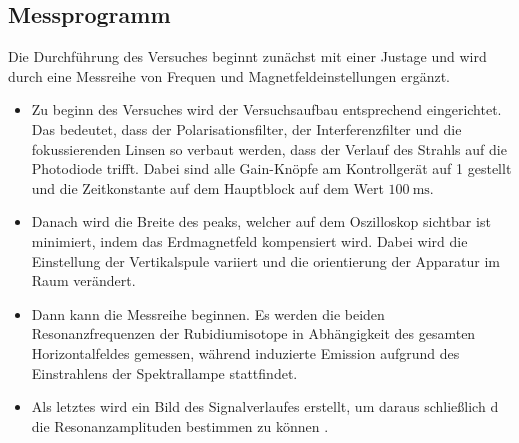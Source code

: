 \subsection{Messprogramm}

Die Durchführung des Versuches beginnt zunächst mit einer Justage und wird 
durch eine Messreihe von Frequen und Magnetfeldeinstellungen ergänzt.

\begin{itemize}
    \item Zu beginn des Versuches wird der Versuchsaufbau entsprechend eingerichtet.
    Das bedeutet, dass der Polarisationsfilter, der Interferenzfilter und die 
    fokussierenden Linsen so verbaut werden, dass der Verlauf des Strahls auf die 
    Photodiode trifft.
    Dabei sind alle Gain-Knöpfe am Kontrollgerät auf 1 gestellt und die Zeitkonstante auf 
    dem Hauptblock auf dem Wert $\SI{100}{\milli\second}$.
    \item Danach wird die Breite des peaks, welcher auf dem Oszilloskop sichtbar ist 
    minimiert, indem das Erdmagnetfeld kompensiert wird. Dabei wird die Einstellung der 
    Vertikalspule variiert und die orientierung der Apparatur im Raum verändert.
    \item Dann kann die Messreihe beginnen. Es werden die beiden Resonanzfrequenzen
    der Rubidiumisotope in Abhängigkeit des gesamten Horizontalfeldes gemessen,
    während induzierte Emission aufgrund des Einstrahlens der Spektrallampe 
    stattfindet.
    \item Als letztes wird ein Bild des Signalverlaufes erstellt, um daraus schließlich d
    die Resonanzamplituden bestimmen zu können \cite{sample}.
\end{itemize}